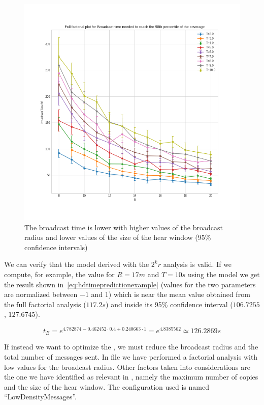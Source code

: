 \begin{figure}
	\centering
	\includegraphics[width=\textwidth]{img/hd/broadcasttime-R-ffplot}
	\caption{The broadcast time is lower with higher values of the broadcast
	radius and lower values of the size of the hear
	window (95\% confidence intervals)}\label{fig:ldtimeff}
\end{figure}

We can verify that the model derived with the \(2^{k}r\) analysis is valid. If we
compute, for example, the value for \(R\!=\!17m\) and \(T\!=\!10s\) using the
model we get the result shown in~\eqref{eq:hdtimepredictionexample} (values for
the two parameters are normalized between \(-1\) and \(1\)) which is near the
mean value obtained from the full factorial analysis (\(117.2s\)) and inside its
95\% confidence interval (\(106.7255\), \(127.6745\)).

\begin{equation}\label{eq:ldtimepredictionexample}
	t_B = e^{4.782874 - 0.462452 \cdot 0.4 + 0.240663 \cdot 1} =
	e^{4.8385562} \simeq 126.2869s
\end{equation}

If instead we want to optimize the , we must reduce
the broadcast radius and the total number of messages sent. In file
 we have performed a factorial analysis with low values for
the broadcast radius. Other factors taken into considerations are the one we
have identified as relevant in , namely the maximum number
of copies and the size of the hear window. The configuration used is named
``LowDensityMessages''.

